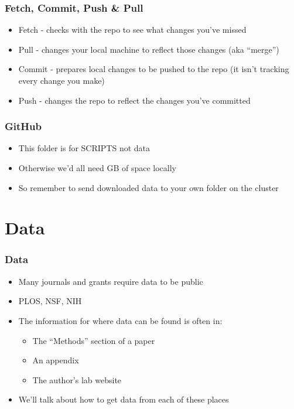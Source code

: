 \documentclass[14pt]{beamer}
\begin{document}
\begin{frame}
\frametitle{Fetch, Commit, Push \& Pull}
\begin{itemize}
	\item<+-> Fetch - checks with the repo to see what changes you've missed
	\item<+-> Pull - changes your local machine to reflect those changes (aka ``merge'')
	\item<+-> Commit - prepares local changes to be pushed to the repo (it isn't tracking every change you make)
	\item<+-> Push - changes the repo to reflect the changes you've committed
\end{itemize}
\end{frame}

\begin{frame}
\frametitle{GitHub}
\begin{itemize}
	\item<+-> This folder is for SCRIPTS not data
	\item<+-> Otherwise we'd all need GB of space locally
	\item<+-> So remember to send downloaded data to your own folder on the cluster
\end{itemize}
\end{frame}

\section{Data}

\begin{frame}
\frametitle{Data}
\begin{itemize}
	\item<+-> Many journals and grants require data to be public
	\item<+-> PLOS, NSF, NIH
	\item<+-> The information for where data can be found is often in:
	\begin{itemize}
		\item<+-> The ``Methods'' section of a paper
		\item<+-> An appendix
		\item<+-> The author's lab website
	\end{itemize}
	\item<+-> We'll talk about how to get data from each of these places 
\end{itemize}
\end{frame}
\end{document}
